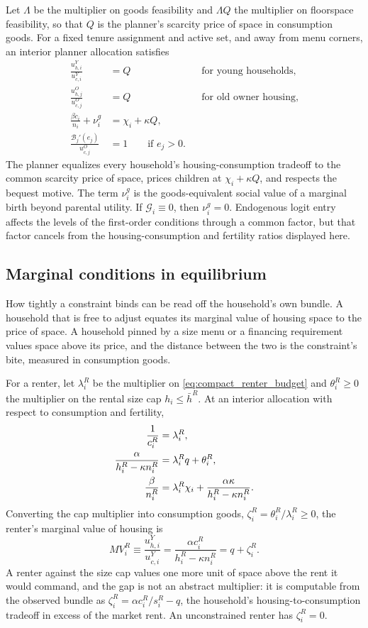 \documentclass[11pt]{article}
\newcommand{\1}{\mathbf 1}
\begin{document}
Let $\Lambda$ be the multiplier on goods feasibility and $\Lambda Q$ the multiplier on floorspace feasibility, so that $Q$ is the planner's scarcity price of space in consumption goods. For a fixed tenure assignment and active set, and away from menu corners, an interior planner allocation satisfies
\begin{align*}
\frac{u^Y_{h,i}}{u^Y_{c,i}}&=Q
&&\text{for young households},
\\
\frac{u^O_{h,j}}{u^O_{c,j}}&=Q
&&\text{for old owner housing},
\\
\frac{\beta c_i}{n_i}+\nu_i^g&=\chi_i+\kappa Q,
\\
\frac{\mathcal B_j'(e_j)}{u^O_{c,j}}&=1
\qquad \text{if }e_j>0.
\end{align*}
The planner equalizes every household's housing-consumption tradeoff to the common scarcity price of space, prices children at $\chi_i+\kappa Q$, and respects the bequest motive.
The term $\nu_i^g$ is the goods-equivalent social value of a marginal birth beyond parental utility. If $\mathcal G_i\equiv0$, then $\nu_i^g=0$.
Endogenous logit entry affects the levels of the first-order conditions through a common factor, but that factor cancels from the housing-consumption and fertility ratios displayed here.

\subsection{Marginal conditions in equilibrium}

How tightly a constraint binds can be read off the household's own bundle. A household that is free to adjust equates its marginal value of housing space to the price of space. A household pinned by a size menu or a financing requirement values space above its price, and the distance between the two is the constraint's bite, measured in consumption goods.

For a renter, let $\lambda_i^R$ be the multiplier on \eqref{eq:compact_renter_budget} and $\theta_i^R\ge0$ the multiplier on the rental size cap $h_i\le\bar h^R$. At an interior allocation with respect to consumption and fertility,
\begin{align}
\frac{1}{c_i^R}&=\lambda_i^R,
\notag\\
\frac{\alpha}{h_i^R-\kappa n_i^R}&=\lambda_i^R q+\theta_i^R,
\notag\\
\frac{\beta}{n_i^R}&=\lambda_i^R\chi_i+\frac{\alpha\kappa}{h_i^R-\kappa n_i^R}.
\label{eq:compact_renter_foc_n}
\end{align}
Converting the cap multiplier into consumption goods, $\zeta_i^R=\theta_i^R/\lambda_i^R\ge0$, the renter's marginal value of housing is
\begin{equation}
MV_i^R
\equiv
\frac{u^Y_{h,i}}{u^Y_{c,i}}
=
\frac{\alpha c_i^R}{h_i^R-\kappa n_i^R}
=
q+\zeta_i^R.
\label{eq:compact_renter_mv}
\end{equation}
A renter against the size cap values one more unit of space above the rent it would command, and the gap is not an abstract multiplier: it is computable from the observed bundle as $\zeta_i^R=\alpha c_i^R/s_i^R-q$, the household's housing-to-consumption tradeoff in excess of the market rent. An unconstrained renter has $\zeta_i^R=0$.
\end{document}
